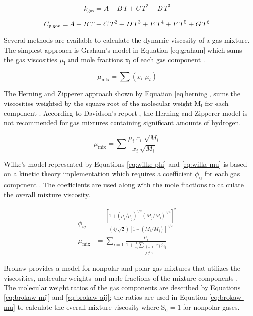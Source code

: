 \begin{equation}\label{eq:thermlcond}
    k_\text{gas} = A + B\,T + C\,T^2 + D\,T^3
\end{equation}

\begin{equation}\label{eq:heatcap}
    C_\text{p\,gas} = A + B\,T + C\,T^2 + D\,T^3 + E\,T^4 + F\,T^5 + G\,T^6
\end{equation}

Several methods are available to calculate the dynamic viscosity of a gas mixture. The simplest approach is Graham's model in Equation \ref{eq:graham} which sums the gas viscosities $\mu_\text{i}$ and mole fractions x$_\text{i}$ of each gas component \cite{Graham-1846}.

\begin{equation}
    \mu_\text{mix} = \sum(x_i \; \mu_i)
    \label{eq:graham}
\end{equation}

\noindent The Herning and Zipperer approach shown by Equation \ref{eq:herning}, sums the viscosities weighted by the square root of the molecular weight M$_\text{i}$ for each component \cite{Herning-1936}. According to Davidson's report \cite{Davidson-1993}, the Herning and Zipperer model is not recommended for gas mixtures containing significant amounts of hydrogen.

\begin{equation}
    \mu_\text{mix} = \sum \frac{\mu_i \; x_i \; \sqrt{M_i}}{x_i \; \sqrt{M_i}}
    \label{eq:herning}
\end{equation}

\noindent Wilke's model represented by Equations \ref{eq:wilke-phi} and \ref{eq:wilke-mu} is based on a kinetic theory implementation which requires a coefficient $\phi_\text{ij}$ for each gas component \cite{Wilke-1950}. The coefficients are used along with the mole fractions to calculate the overall mixture viscosity.

\begin{align}
    \phi_{ij} &= \frac{\left[1 + (\mu_i/\mu_j)^{1/2} (M_j/M_i)^{1/4}\right]^2}{(4/\sqrt{2}) \left[1 + (M_i/M_j)\right]^{1/2}} \label{eq:wilke-phi} \\
    \mu_{\text{mix}} &= \sum_{i=1} \frac{\mu_i}{1 + \frac{1}{x_i} \sum_{\substack{j=1 \\j \neq i}} x_j \, \phi_{ij}} \label{eq:wilke-mu}
\end{align}

\noindent Brokaw provides a model for nonpolar and polar gas mixtures that utilizes the viscosities, molecular weights, and mole fractions of the mixture components \cite{Brokaw-1968}. The molecular weight ratios of the gas components are described by Equations \ref{eq:brokaw-mij} and \ref{eq:brokaw-aij}; the ratios are used in Equation \ref{eq:brokaw-mu} to calculate the overall mixture viscosity where S$_\text{ij} = 1$ for nonpolar gases.

